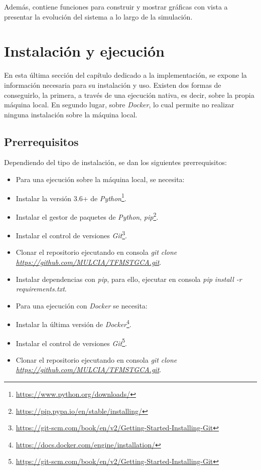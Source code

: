 Además, contiene funciones para construir y mostrar gráficas con vista a presentar la evolución
del sistema a lo largo de la simulación.

\section{Instalación y ejecución}

En esta última sección del capítulo dedicado a la implementación, se expone la información necesaria
para su instalación y uso. Existen dos formas de conseguirlo, la primera, a través de una ejecución
nativa, es decir, sobre la propia máquina local. En segundo lugar, sobre \textit{Docker}, lo cual permite
no realizar ninguna instalación sobre la máquina local.

\subsection{Prerrequisitos}

Dependiendo del tipo de instalación, se dan los siguientes prerrequisitos:

\begin{itemize}
  \item Para una ejecución sobre la máquina local, se necesita:
        \item Instalar la versión 3.6+ de \textit{Python}\footnote{\url{https://www.python.org/downloads/}}.
        \item Instalar el gestor de paquetes de \textit{Python}, \textit{pip}\footnote{\url{https://pip.pypa.io/en/stable/installing/}}.
        \item Instalar el control de versiones \textit{Git}\footnote{\url{https://git-scm.com/book/en/v2/Getting-Started-Installing-Git}}.
        \item Clonar el repositorio ejecutando en consola \textit{git clone \url{https://github.com/MULCIA/TFMSTGCA.git}}.
        \item Instalar dependencias con \textit{pip}, para ello, ejecutar en consola \textit{pip install -r requirements.txt}.
  \item Para una ejecución con \textit{Docker} se necesita:
        \item Instalar la última versión de \textit{Docker}\footnote{\url{https://docs.docker.com/engine/installation/}}.
        \item Instalar el control de versiones \textit{Git}\footnote{\url{https://git-scm.com/book/en/v2/Getting-Started-Installing-Git}}.
        \item Clonar el repositorio ejecutando en consola \textit{git clone \url{https://github.com/MULCIA/TFMSTGCA.git}}.
\end{itemize}

